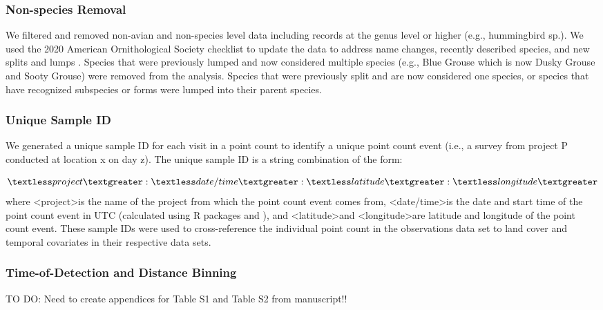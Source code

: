 \subsubsection{Non-species Removal}
\par We filtered and removed non-avian and non-species level data including records at the genus level or higher (e.g., hummingbird sp.). We used the 2020 American Ornithological Society checklist to update the data to address name changes, recently described species, and new splits and lumps \citep{chesser_sixty-first_2020}. Species that were previously lumped and now considered multiple species (e.g., Blue Grouse which is now Dusky Grouse and Sooty Grouse) were removed from the analysis. Species that were previously split and are now considered one species, or species that have recognized subspecies or forms were lumped into their parent species. 

\subsubsection{Unique Sample ID}
\par We generated a unique sample ID for each visit in a point count to identify a unique point count event (i.e., a survey from project P conducted at location x on day z). The unique sample ID is a string combination of the form:

 $$\textless project\textgreater:\textless date/time\textgreater:\textless latitude\textgreater:\textless longitude\textgreater$$
 where \textless project\textgreater  is the name of the project from which the point count event comes from, \textless date/time\textgreater  is the date and start time of the point count event in UTC (calculated using R packages \citep{teucher_lutz_2019} and \citep{urbanek_proj4_2020}), and \textless latitude\textgreater  and \textless longitude\textgreater  are latitude and longitude of the point count event. These sample IDs were used to cross-reference the individual point count in the observations data set to land cover and temporal covariates in their respective data sets.

\subsubsection{Time-of-Detection and Distance Binning}
\par TO DO: Need to create appendices for Table S1 and Table S2 from manuscript!!

